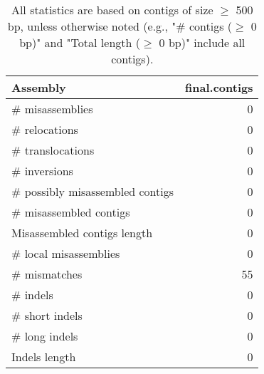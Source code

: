 \documentclass[12pt,a4paper]{article}
\begin{document}
\begin{table}[ht]
\begin{center}
\caption{All statistics are based on contigs of size $\geq$ 500 bp, unless otherwise noted (e.g., "\# contigs ($\geq$ 0 bp)" and "Total length ($\geq$ 0 bp)" include all contigs).}
\begin{tabular}{|l*{1}{|r}|}
\hline
Assembly & final.contigs \\ \hline
\# misassemblies & 0 \\ \hline
\hspace{5mm}\# relocations & 0 \\ \hline
\hspace{5mm}\# translocations & 0 \\ \hline
\hspace{5mm}\# inversions & 0 \\ \hline
\# possibly misassembled contigs & 0 \\ \hline
\# misassembled contigs & 0 \\ \hline
Misassembled contigs length & 0 \\ \hline
\# local misassemblies & 0 \\ \hline
\# mismatches & 55 \\ \hline
\# indels & 0 \\ \hline
\hspace{5mm}\# short indels & 0 \\ \hline
\hspace{5mm}\# long indels & 0 \\ \hline
Indels length & 0 \\ \hline
\end{tabular}
\end{center}
\end{table}
\end{document}
